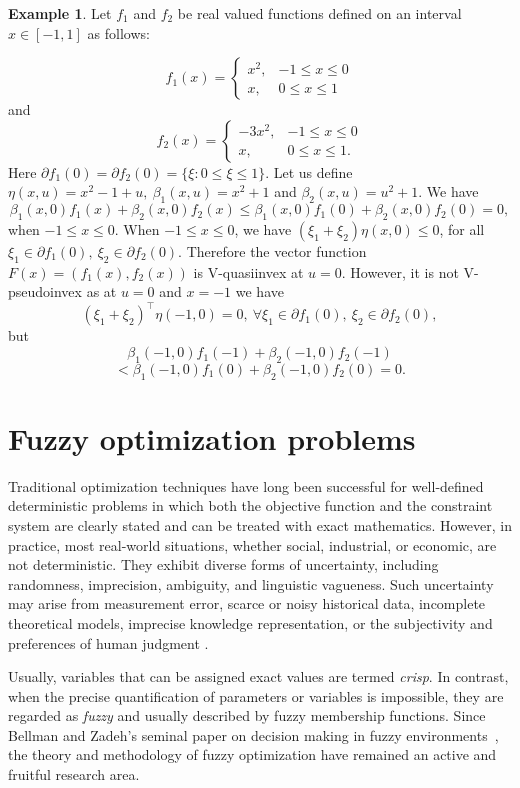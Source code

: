 \documentclass{article}
\theoremstyle{definition}
\newtheorem{example}[maar]{Example}
\begin{document}
\begin{example} Let $f_1$ and $f_2$ be real valued functions defined on an interval $x \in [-1,1]$ as follows:

$$f_1(x) = \begin{cases} x^2, & -1 \leq x \leq 0 \\
x, & 0 \leq x \leq 1
\end{cases}
$$and$$ 
f_2(x) = \begin{cases} -3x^2, & -1 \leq x \leq 0 \\
x, & 0 \leq x \leq 1.
\end{cases}$$
Here $\partial f_1(0) = \partial f_2(0) = \{\xi : 0 \leq \xi \leq 1\}$. Let us define $\eta(x,u) = x^2 - 1 + u,\ \beta_1(x,u) = x^2 + 1$ and $\beta_2(x,u) = u^2 + 1$. We have
$$\beta_1(x,0)f_1(x) + \beta_2(x,0)f_2(x) \leq \beta_1(x,0)f_1(0) + \beta_2(x,0)f_2(0) = 0,$$
when $-1 \leq x \leq 0$. When $-1 \leq x \leq 0$, we have $(\xi_1 + \xi_2)\eta(x,0) \leq 0$, for all $\xi_1 \in \partial f_1(0),\ \xi_2 \in \partial f_2(0)$. Therefore the vector function $F(x) = (f_1(x),f_2(x))$ is V-quasiinvex at $u = 0$. However, it is not V-pseudoinvex as at $u = 0$ and $x = -1$ we have
$$(\xi_1 + \xi_2)^\top\eta(-1,0) = 0,\ \forall \xi_1 \in \partial f_1(0),\ \xi_2 \in \partial f_2(0),$$
but
$$\beta_1(-1,0)f_1(-1) + \beta_2(-1,0)f_2(-1)$$
$$< \beta_1(-1,0)f_1(0) + \beta_2(-1,0)f_2(0) = 0.$$
\end{example}

\section{Fuzzy optimization problems }
Traditional optimization techniques have long been successful for well-defined deterministic problems in which both the objective function and the constraint system are clearly stated and can be treated with exact mathematics.  However, in practice, most real-world situations, whether social, industrial, or economic, are not deterministic.  They exhibit diverse forms of uncertainty, including randomness, imprecision, ambiguity, and linguistic vagueness.  Such uncertainty may arise from measurement error, scarce or noisy historical data, incomplete theoretical models, imprecise knowledge representation, or the subjectivity and preferences of human judgment \cite{Zim}.

Usually, variables that can be assigned exact values are termed \emph{crisp}. In contrast, when the precise quantification of parameters or variables is impossible, they are regarded as \emph{fuzzy} and usually described by fuzzy membership functions.  Since Bellman and Zadeh’s seminal paper on decision making in fuzzy environments~\cite{BeZa}, the theory and methodology of fuzzy optimization have remained an active and fruitful research area.
\end{document}
